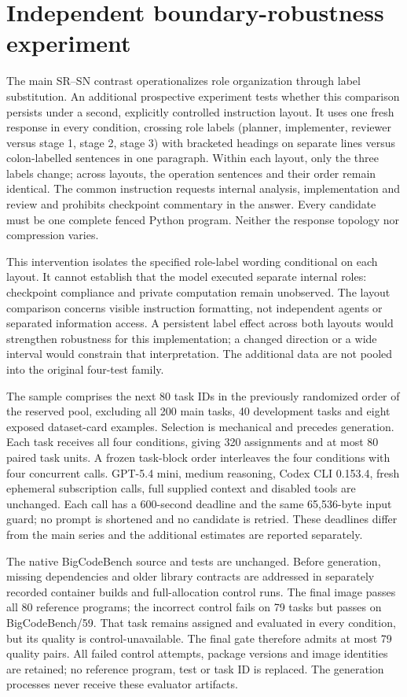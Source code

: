 \section{Independent boundary-robustness experiment}
\label{sec:segregation80}

The main SR--SN contrast operationalizes role organization through label substitution. An additional prospective experiment tests whether this comparison persists under a second, explicitly controlled instruction layout. It uses one fresh response in every condition, crossing role labels (planner, implementer, reviewer versus stage 1, stage 2, stage 3) with bracketed headings on separate lines versus colon-labelled sentences in one paragraph. Within each layout, only the three labels change; across layouts, the operation sentences and their order remain identical. The common instruction requests internal analysis, implementation and review and prohibits checkpoint commentary in the answer. Every candidate must be one complete fenced Python program. Neither the response topology nor compression varies.

This intervention isolates the specified role-label wording conditional on each layout. It cannot establish that the model executed separate internal roles: checkpoint compliance and private computation remain unobserved. The layout comparison concerns visible instruction formatting, not independent agents or separated information access. A persistent label effect across both layouts would strengthen robustness for this implementation; a changed direction or a wide interval would constrain that interpretation. The additional data are not pooled into the original four-test family.

The sample comprises the next 80 task IDs in the previously randomized order of the reserved pool, excluding all 200 main tasks, 40 development tasks and eight exposed dataset-card examples. Selection is mechanical and precedes generation. Each task receives all four conditions, giving 320 assignments and at most 80 paired task units. A frozen task-block order interleaves the four conditions with four concurrent calls. GPT-5.4 mini, medium reasoning, Codex CLI 0.153.4, fresh ephemeral subscription calls, full supplied context and disabled tools are unchanged. Each call has a 600-second deadline and the same 65,536-byte input guard; no prompt is shortened and no candidate is retried. These deadlines differ from the main series and the additional estimates are reported separately.

The native BigCodeBench source and tests are unchanged. Before generation, missing dependencies and older library contracts are addressed in separately recorded container builds and full-allocation control runs. The final image passes all 80 reference programs; the incorrect control fails on 79 tasks but passes on BigCodeBench/59. That task remains assigned and evaluated in every condition, but its quality is control-unavailable. The final gate therefore admits at most 79 quality pairs. All failed control attempts, package versions and image identities are retained; no reference program, test or task ID is replaced. The generation processes never receive these evaluator artifacts.

